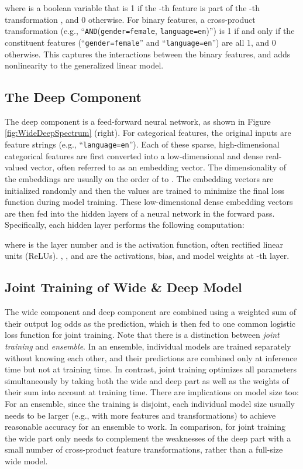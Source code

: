 \documentclass{sig-alternate-05-2015}
\begin{document}
where  is a boolean variable that is 1 if the -th feature is part of the -th transformation , and 0 otherwise. For binary features, a cross-product transformation (e.g., ``\texttt{AND}(\texttt{gender=female}, \texttt{language=en})'') is 1 if and only if the constituent features (``\texttt{gender=female}'' and ``\texttt{language=en}'') are all 1, and 0 otherwise.
This captures the interactions between the binary features, and adds nonlinearity to the generalized linear model.

\subsection{The Deep Component}
The deep component is a feed-forward neural network, as shown in Figure \ref{fig:WideDeepSpectrum} (right).
For categorical features, the original inputs are feature strings (e.g., ``\texttt{language=en}''). Each of these sparse, high-dimensional categorical features are first converted into a low-dimensional and dense real-valued vector, often referred to as an embedding vector. The dimensionality of the embeddings are usually on the order of  to . The embedding vectors are initialized randomly and then the values are trained to minimize the final loss function during model training. These low-dimensional dense embedding vectors are then fed into the hidden layers of a neural network in the forward pass. Specifically, each hidden layer performs the following computation:

where  is the layer number and  is the activation function, often rectified linear units (ReLUs). , , and  are the activations, bias, and model weights at -th layer.

\subsection{Joint Training of Wide \& Deep Model}
The wide component and deep component are combined using a weighted sum of their output log odds as the prediction, which is then fed to one common logistic loss function for joint training.
Note that there is a distinction between \textit{joint training} and \textit{ensemble}.
In an ensemble, individual models are trained separately without knowing each other, and their predictions are combined only at inference time but not at training time.
In contrast, joint training optimizes all parameters simultaneously by taking both the wide and deep part as well as the weights of their sum into account at training time.
There are implications on model size too:
For an ensemble, since the training is disjoint, each individual model size usually needs to be larger (e.g., with more features and transformations) to achieve reasonable accuracy for an ensemble to work.
In comparison, for joint training the wide part only needs to complement the weaknesses of the deep part with a small number of cross-product feature transformations, rather than a full-size wide model.
\end{document}
